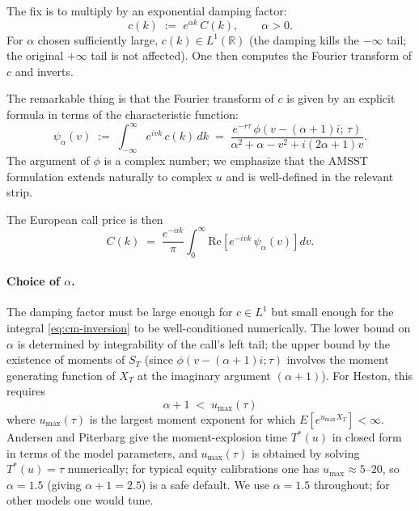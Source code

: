 \documentclass[11pt]{article}
\theoremstyle{plain}
\theoremstyle{definition}
\theoremstyle{remark}
\begin{document}
The fix is to multiply by an exponential damping factor:
\begin{equation}
    c(k) \;:=\; e^{\alpha k}\, C(k), \qquad \alpha > 0.                                              \label{eq:cm-damping}
\end{equation}
For \(\alpha\) chosen sufficiently large, \(c(k) \in L^1(\mathbb{R})\) (the damping kills the \(-\infty\) tail; the original \(+\infty\) tail is not affected). One then computes the Fourier transform of \(c\) and inverts.

The remarkable thing is that the Fourier transform of \(c\) is given by an explicit formula in terms of the characteristic function:
\begin{equation}
    \psi_\alpha(v) \;:=\; \int_{-\infty}^\infty e^{i v k}\, c(k)\, dk \;=\; \frac{e^{-r\tau}\, \phi\!\left(v - (\alpha + 1)i;\, \tau\right)}{\alpha^2 + \alpha - v^2 + i(2\alpha + 1) v}.                                       \label{eq:cm-psi}
\end{equation}
The argument of \(\phi\) is a complex number; we emphasize that the AMSST formulation extends naturally to complex \(u\) and is well-defined in the relevant strip.

The European call price is then
\begin{equation}
    C(k) \;=\; \frac{e^{-\alpha k}}{\pi} \int_0^\infty \mathrm{Re}\!\left[e^{-i v k}\, \psi_\alpha(v)\right] dv.                                                  \label{eq:cm-inversion}
\end{equation}

\paragraph{Choice of \(\alpha\).} The damping factor must be large enough for \(c \in L^1\) but small enough for the integral \eqref{eq:cm-inversion} to be well-conditioned numerically. The lower bound on \(\alpha\) is determined by integrability of the call's left tail; the upper bound by the existence of moments of \(S_T\) (since \(\phi(v - (\alpha+1)i; \tau)\) involves the moment generating function of \(X_T\) at the imaginary argument \((\alpha + 1)\)). For Heston, this requires
\[
    \alpha + 1 \;<\; u_{\max}(\tau)
\]
where \(u_{\max}(\tau)\) is the largest moment exponent for which \(E[e^{u_{\max} X_T}] < \infty\). Andersen and Piterbarg \cite{AndersenPiterbarg2007} give the moment-explosion time \(T^*(u)\) in closed form in terms of the model parameters, and \(u_{\max}(\tau)\) is obtained by solving \(T^*(u) = \tau\) numerically; for typical equity calibrations one has \(u_{\max} \approx 5\)--\(20\), so \(\alpha = 1.5\) (giving \(\alpha + 1 = 2.5\)) is a safe default. We use \(\alpha = 1.5\) throughout; for other models one would tune.
\end{document}

